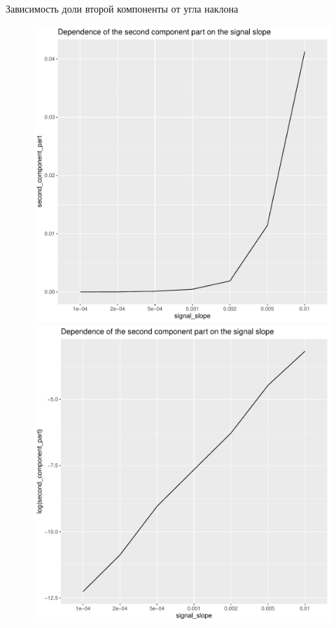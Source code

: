 \documentclass[ucs, notheorems, handout]{beamer}
\begin{document}
\begin{frame}{Зависимость доли второй компоненты от угла наклона}
    \begin{figure}[h]
        \centering
        \begin{minipage}{.5\textwidth}
            \centering
            \includegraphics[width=\textwidth]{experiment_3_secondpart1.pdf}
        \end{minipage}%
        \begin{minipage}{.5\textwidth}
            \centering
        \includegraphics[width=\textwidth]{experiment_3_secondpart2.pdf}

\end{minipage}
\end{figure}
\end{frame}
\end{document}
